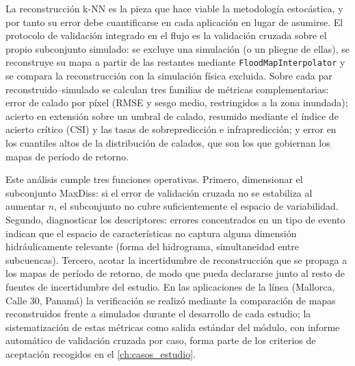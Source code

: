 La reconstrucción k-NN es la pieza que hace viable la metodología estocástica, y por tanto su error debe cuantificarse en cada aplicación en lugar de asumirse. El protocolo de validación integrado en el flujo es la validación cruzada sobre el propio subconjunto simulado: se excluye una simulación (o un pliegue de ellas), se reconstruye su mapa a partir de las restantes mediante \texttt{FloodMapInterpolator} y se compara la reconstrucción con la simulación física excluida. Sobre cada par reconstruido--simulado se calculan tres familias de métricas complementarias: error de calado por píxel (RMSE y sesgo medio, restringidos a la zona inundada); acierto en extensión sobre un umbral de calado, resumido mediante el índice de acierto crítico (CSI) y las tasas de sobrepredicción e infrapredicción; y error en los cuantiles altos de la distribución de calados, que son los que gobiernan los mapas de período de retorno.

Este análisis cumple tres funciones operativas. Primero, dimensionar el subconjunto MaxDiss: si el error de validación cruzada no se estabiliza al aumentar $n$, el subconjunto no cubre suficientemente el espacio de variabilidad. Segundo, diagnosticar los descriptores: errores concentrados en un tipo de evento indican que el espacio de características no captura alguna dimensión hidráulicamente relevante (forma del hidrograma, simultaneidad entre subcuencas). Tercero, acotar la incertidumbre de reconstrucción que se propaga a los mapas de período de retorno, de modo que pueda declararse junto al resto de fuentes de incertidumbre del estudio. En las aplicaciones de la línea (Mallorca, Calle 30, Panamá) la verificación se realizó mediante la comparación de mapas reconstruidos frente a simulados durante el desarrollo de cada estudio; la sistematización de estas métricas como salida estándar del módulo, con informe automático de validación cruzada por caso, forma parte de los criterios de aceptación recogidos en el \cref{ch:casos_estudio}.
